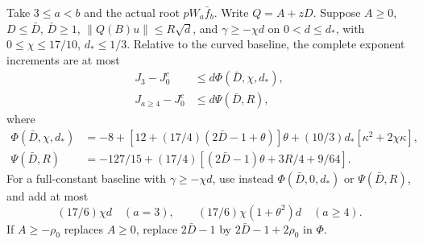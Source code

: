 \begin{lemma}
\label{lem:odd-complete:minimum-one}
Take $3\le a<b$ and the actual root $pW_a\bar f_b$.
Write $Q=A+zD$. Suppose $A\ge0$, $D\le\bar D$, $\bar D\ge1$,
$\|Q(B)u\|\le R\sqrt d$, and $\gamma\ge-\chi d$ on
$0<d\le d_*$, with $0\le\chi\le17/10$, $d_*\le1/3$.
Relative to the curved baseline, the complete exponent increments
are at most
\begin{align}
 J_3-J_0^c&\le d\Phi(\bar D,\chi,d_*),
    \label{eq:odd-complete:Phi}\\
 J_{a\ge4}-J_0^c&\le d\Psi(\bar D,R),
    \label{eq:odd-complete:Psi}
\end{align}
where
\[
\begin{aligned}
 \Phi(\bar D,\chi,d_*)&=-8+
 [12+(17/4)(2\bar D-1+\theta)]\theta
       +(10/3)d_*[\kappa^2+2\chi\kappa],\\
 \Psi(\bar D,R)&=-127/15+
       (17/4)[(2\bar D-1)\theta+3R/4+9/64].
\end{aligned}
\]
For a full-constant baseline with $\gamma\ge-\chi d$, use instead
$\Phi(\bar D,0,d_*)$ or $\Psi(\bar D,R)$, and add at most
\begin{equation}\label{eq:odd-complete:full-fees}
 (17/6)\chi d\quad(a=3),\qquad
 (17/6)\chi(1+\theta^2)d\quad(a\ge4).
\end{equation}
If $A\ge-\rho_0$ replaces $A\ge0$, replace
$2\bar D-1$ by $2\bar D-1+2\rho_0$ in $\Phi$.
\end{lemma}
